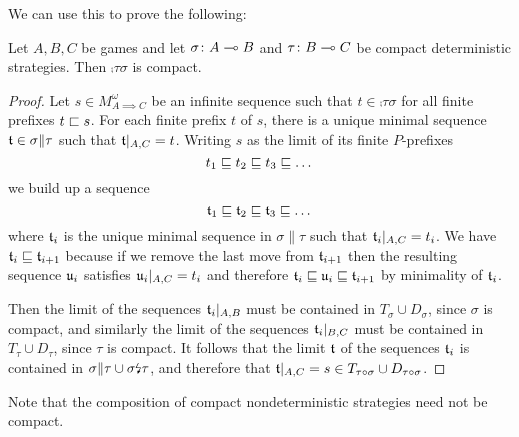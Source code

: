 \documentclass{article}
\newcommand{\dv}{{\text{\lightning}}}
\begin{document}
We can use this to prove the following:

\begin{proposition}
  Let $A,B,C$ be games and let $\sigma\colon A\multimap B$ and $\tau\colon B\multimap C$ be compact deterministic strategies.  Then $\comp\tau\sigma$ is compact.
  \begin{proof}
    Let $s\in M_{A\implies C}^\omega$ be an infinite sequence such that $t\in\comp\tau\sigma$ for all finite prefixes $t\sqsubset s$.  For each finite prefix $t$ of $s$, there is a unique minimal sequence $\mathfrak t\in\sigma\|\tau$ such that $\mathfrak t\vert_{A,C}=t$.  Writing $s$ as the limit of its finite $P$-prefixes
    \[
      t_1 \sqsubseteq t_2 \sqsubseteq t_3 \sqsubseteq \dots
      \]
    we build up a sequence
    \[
      \mathfrak t_1 \sqsubseteq \mathfrak t_2 \sqsubseteq \mathfrak t_3 \sqsubseteq \dots
      \]
    where $\mathfrak t_i$ is the unique minimal sequence in $\sigma\|\tau$ such that $\mathfrak t_i\vert_{A,C}=t_i$.  We have $\mathfrak t_i\sqsubseteq\mathfrak t_{i+1}$ because if we remove the last move from $\mathfrak t_{i+1}$ then the resulting sequence $\mathfrak u_i$ satisfies $\mathfrak u_i\vert_{A,C}=t_i$ and therefore $\mathfrak t_i\sqsubseteq\mathfrak u_i\sqsubseteq\mathfrak t_{i+1}$ by minimality of $\mathfrak t_i$.  

    Then the limit of the sequences $\mathfrak t_i\vert_{A,B}$ must be contained in $T_\sigma\cup D_\sigma$, since $\sigma$ is compact, and similarly the limit of the sequences $\mathfrak t_i\vert_{B,C}$ must be contained in $T_\tau\cup D_\tau$, since $\tau$ is compact.  It follows that the limit $\mathfrak t$ of the sequences $\mathfrak t_i$ is contained in $\sigma\|\tau\cup\sigma\dv\tau$, and therefore that $\mathfrak t\vert_{A,C}=s\in T_{\tau \circ \sigma}\cup D_{\tau \circ \sigma}$.
  \end{proof}
\end{proposition}

Note that the composition of compact nondeterministic strategies need not be compact.
\end{document}

